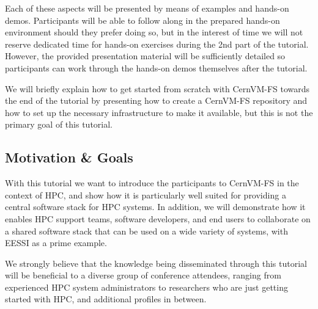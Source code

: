 Each of these aspects will be presented by means of examples and hands-on demos.
Participants will be able to follow along in the prepared hands-on environment should they prefer doing so,
but in the interest of time we will not reserve dedicated time for
hands-on exercises during the 2nd part of the tutorial. However, the provided presentation material
will be sufficiently detailed so participants can work through the hands-on demos themselves after the tutorial.

We will briefly explain how to get started from scratch with CernVM-FS towards the end of the tutorial by presenting
how to create a CernVM-FS repository and how to set up the necessary infrastructure to make it available,
but this is not the primary goal of this tutorial.

\subsection*{Motivation \& Goals}

With this tutorial we want to introduce the participants to CernVM-FS in the context of HPC,
and show how it is particularly well suited for providing a central software stack for HPC systems.
In addition, we will demonstrate how it enables HPC support teams, software developers, and end users to
collaborate on a shared software stack that can be used on a wide variety of systems, with EESSI as a prime example.

We strongly believe that the knowledge being disseminated through this tutorial will be beneficial
to a diverse group of conference attendees, ranging from experienced HPC system administrators to researchers
who are just getting started with HPC, and additional profiles in between.




